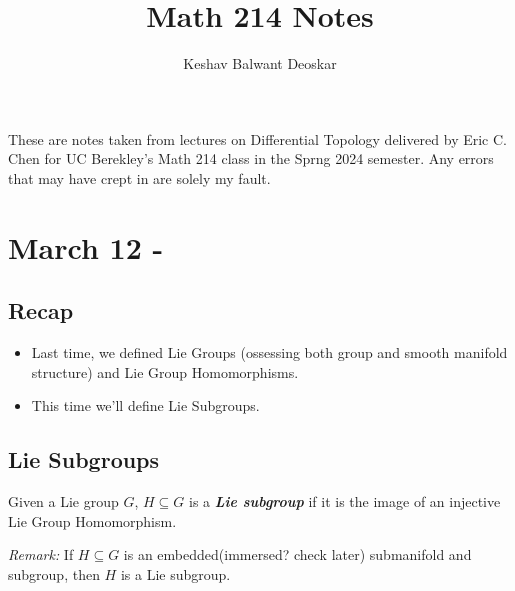 \documentclass{article}
\title{Math 214 Notes}
\author{Keshav Balwant Deoskar}
\begin{document}
\maketitle

These are notes taken from lectures on Differential Topology delivered by Eric C. Chen for UC Berekley's Math 214 class in the Sprng 2024 semester. Any errors that may have crept in are solely my fault.

\tableofcontents

\pagebreak

\section{March 12 - }
\subsection*{Recap}
\begin{itemize}
  \item Last time, we defined Lie Groups (ossessing both group and smooth manifold structure) and Lie Group Homomorphisms.
  \item This time we'll define Lie Subgroups.
\end{itemize}


\vskip 0.25cm
\subsection{Lie Subgroups}

\begin{mathdefinitionbox}{}
  Given a Lie group $G$, $H \subseteq G$ is a \emph{\textbf{Lie subgroup}} if it is the image of an injective Lie Group Homomorphism. 
\end{mathdefinitionbox}

\begin{dottedbox}
  \emph{Remark:} If $H \subseteq G$ is an embedded(immersed? check later) submanifold and subgroup, then $H$ is a Lie subgroup.
\end{dottedbox}
\end{document}
